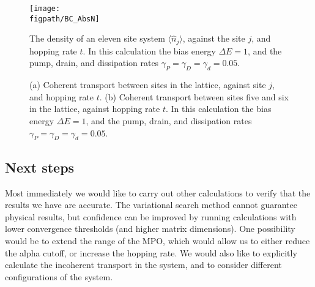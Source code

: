 \begin{figure}[ht!]
	\centering
	\texttt{[image: \\figpath/BC\_AbsN]}
	\caption{\label{fig:fw1-3}The density of an eleven site system \(\langle \hat{n}_{j} \rangle\), against the site \(j\), and hopping rate \(t\). In this calculation the bias energy \(\Delta E = 1\), and the pump, drain, and dissipation rates \(\gamma_{P} = \gamma_{D} = \gamma_{d} = 0.05\).}
\end{figure}

\begin{figure}[hb!]
	 \hfill
	\caption{\label{fig:fw1-4}(a) Coherent transport between sites in the lattice, against site \(j\), and hopping rate \(t\). (b) Coherent transport between sites five and six in the lattice, against hopping rate \(t\). In this calculation the bias energy \(\Delta E = 1\), and the pump, drain, and dissipation rates \(\gamma_{P} = \gamma_{D} = \gamma_{d} = 0.05\).}
\end{figure}

\subsection{Next steps}
Most immediately we would like to carry out other calculations to verify that the results we have are accurate. The variational search method cannot guarantee physical results, but confidence can be improved by running calculations with lower convergence thresholds (and higher matrix dimensions). One possibility would be to extend the range of the MPO, which would allow us to either reduce the alpha cutoff, or increase the hopping rate. We would also like to explicitly calculate the incoherent transport in the system, and to consider different configurations of the system.